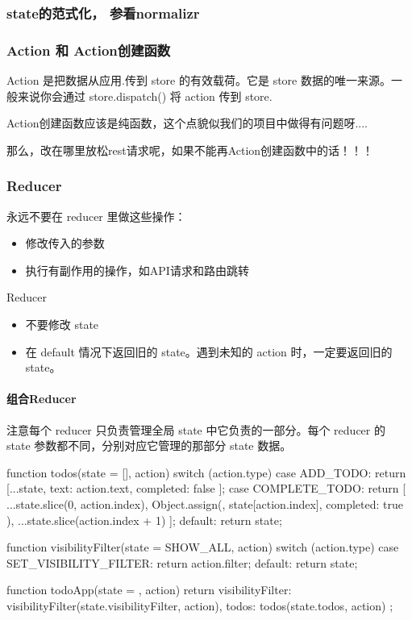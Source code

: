 \subsubsection{state的范式化， 参看normalizr }

\subsubsection{Action 和 Action创建函数}

Action 是把数据从应用.传到 store 的有效载荷。它是 store 数据的唯一来源。一般来说你会通过 store.dispatch() 将 action 传到 store.

Action创建函数应该是纯函数，这个点貌似我们的项目中做得有问题呀....

那么，改在哪里放松rest请求呢，如果不能再Action创建函数中的话！！！



\subsubsection{Reducer}

永远不要在 reducer 里做这些操作：

\begin{itemize}
\item 修改传入的参数
\item 执行有副作用的操作，如API请求和路由跳转
\end{itemize}


Reducer
\begin{itemize}
\item 不要修改 state
\item 在 default 情况下返回旧的 state。遇到未知的 action 时，一定要返回旧的 state。
\end{itemize}

\paragraph{组合Reducer}

注意每个 reducer 只负责管理全局 state 中它负责的一部分。每个 reducer 的 state 参数都不同，分别对应它管理的那部分 state 数据。

\begin{JavaScript}

function todos(state = [], action) {
  switch (action.type) {
    case ADD_TODO:
      return [...state, {
        text: action.text,
        completed: false
      }];
    case COMPLETE_TODO:
      return [
        ...state.slice(0, action.index),
        Object.assign({}, state[action.index], {
          completed: true
        }),
        ...state.slice(action.index + 1)
      ];
    default:
      return state;
  }
}

function visibilityFilter(state = SHOW_ALL, action) {
  switch (action.type) {
    case SET_VISIBILITY_FILTER:
      return action.filter;
    default:
      return state;
  }
}

function todoApp(state = {}, action) {
  return {
    visibilityFilter: visibilityFilter(state.visibilityFilter, action),
    todos: todos(state.todos, action)
  };
}


\end{JavaScript}

